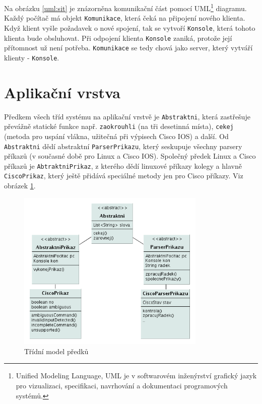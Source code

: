Na obrázku \ref{uml:sit} je znázorněna komunikační část pomocí UML\footnote{Unified Modeling Language, UML je v softwarovém inženýrství grafický jazyk pro vizualizaci, specifikaci, navrhování a dokumentaci programových systémů.\cite{wiki:uml}} diagramu. Každý počítač má objekt \verb|Komunikace|, která čeká na připojení nového klienta. Když klient vyšle požadavek o nové spojení, tak se vytvoří \verb|Konsole|, která tohoto klienta bude obsluhovat. Při odpojení klienta \verb|Konsole| zaniká, protože její přítomnost už není potřeba. \verb|Komunikace| se tedy chová jako server, který vytváří klienty - \verb|Konsole|.


\section{Aplikační vrstva}
Předkem všech tříd systému na aplikační vrstvě je \verb|Abstraktni|, která zastřešuje převážně statické funkce např. \verb|zaokrouhli| (na tři desetinná místa), \verb|cekej| (metoda pro uspání vlákna, užitečná při výpisech Cisco IOS) a další. Od \verb|Abstraktni| dědí abstraktní \verb|ParserPrikazu|, který seskupuje všechny parsery příkazů (v současné době pro Linux a Cisco IOS). Společný předek Linux a Cisco příkazů je \verb|AbtraktniPrikaz|, z kterého dědí linuxové příkazy kolegy a hlavně \verb|CiscoPrikaz|, který ještě přidává speciálné metody jen pro Cisco příkazy. Viz obrázek \ref{uml:abstraktni}.

\begin{figure}[h]
\begin{center}
\includegraphics[width=9cm]{figures/uml_abtraktni.png}
\caption{Třídní model předků}
\label{uml:abstraktni}
\end{center}
\end{figure}

